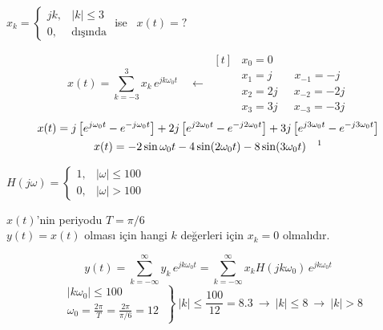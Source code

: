 \documentclass[11pt,a4paper]{article}
\begin{document}
\begin{ornek}[(Ex)]
$x_k = \begin{cases} jk, & |k| \leq 3 \\ 0, & \text{dışında} \end{cases}$ \quad ise \ $x(t) = ?$
\end{ornek}
\begin{cozum}
\[ x(t) = \sum_{k=-3}^{3} x_k\,e^{jk\omega_0 t} \quad \longleftarrow \ \begin{aligned}[t] & x_0 = 0 \\ & x_1 = j \qquad x_{-1} = -j \\ & x_2 = 2j \quad\ \ x_{-2} = -2j \\ & x_3 = 3j \quad\ \ x_{-3} = -3j \end{aligned} \]
\begin{gather*}
  x(t) = j\left[e^{j\omega_0 t} - e^{-j\omega_0 t}\right] + 2j\left[e^{j2\omega_0 t} - e^{-j2\omega_0 t}\right] + 3j\left[e^{j3\omega_0 t} - e^{-j3\omega_0 t}\right] \\
  x(t) = -2\sin\omega_0 t - 4\sin(2\omega_0 t) - 8\sin(3\omega_0 t) \quad \text{\footnotemark}
\end{gather*}
\end{cozum}

\begin{ornek}[(Ex)]
$H(j\omega) = \begin{cases} 1, & |\omega| \leq 100 \\ 0, & |\omega| > 100 \end{cases}$ \qquad
\begin{minipage}[t]{0.55\linewidth}
$x(t)$'nin periyodu $T = \pi/6$\\
$y(t) = x(t)$ olması için hangi $k$ değerleri için $x_k = 0$ olmalıdır.
\end{minipage}
\end{ornek}
\begin{cozum}
\[ y(t) = \sum_{k=-\infty}^{\infty} y_k\,e^{jk\omega_0 t} = \sum_{k=-\infty}^{\infty} x_k H(jk\omega_0)\,e^{jk\omega_0 t} \]
\[ \left.\begin{aligned} & |k\omega_0| \leq 100 \\ & \omega_0 = \frac{2\pi}{T} = \frac{2\pi}{\pi/6} = 12 \end{aligned}\ \right\}\ |k| \leq \frac{100}{12} = 8.3 \ \rightarrow\ |k| \leq 8 \ \rightarrow\ |k| > 8 \]
\end{cozum}
\end{document}

